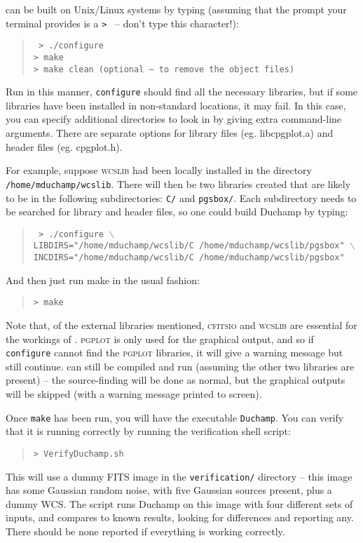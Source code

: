 \duchamp can be built on Unix/Linux systems by typing (assuming that
the prompt your terminal provides is a \texttt{> } -- don't type this
character!):
\begin{quote}
{\footnotesize
\texttt{%
> ./configure\\
> make\\
> make clean (optional -- to remove the object files)}
}
\end{quote}

Run in this manner, \texttt{configure} should find all the necessary
libraries, but if some libraries have been installed in non-standard
locations, it may fail. In this case, you can specify additional
directories to look in by giving extra command-line arguments. There
are separate options for library files (eg. libcpgplot.a) and header
files (eg. cpgplot.h).

For example, suppose \textsc{wcslib} had been locally installed in the
directory \texttt{/home/mduchamp/wcslib}. There will then be two
libraries created that are likely to be in the following
subdirectories: \texttt{C/} and \texttt{pgsbox/}. Each subdirectory
needs to be searched for library and header files, so one could build
Duchamp by typing:
\begin{quote}
{\footnotesize
\texttt{%
>  ./configure $\backslash$ \\ 
LIBDIRS="/home/mduchamp/wcslib/C /home/mduchamp/wcslib/pgsbox" 
$\backslash$\\
INCDIRS="/home/mduchamp/wcslib/C /home/mduchamp/wcslib/pgsbox"}
}
\end{quote}
And then just run make in the usual fashion:
\begin{quote}
{\footnotesize
\texttt{> make}
}
\end{quote}

Note that, of the external libraries mentioned, \textsc{cfitsio} and
\textsc{wcslib} are essential for the workings of
\duchamp. \textsc{pgplot} is only used for the graphical output, and
so if \texttt{configure} cannot find the \textsc{pgplot} libraries, it
will give a warning message but still continue. \duchamp can still be
compiled and run (assuming the other two libraries are present) -- the
source-finding will be done as normal, but the graphical outputs will
be skipped (with a warning message printed to screen).

Once \texttt{make} has been run, you will have the executable
\texttt{Duchamp}. You can verify that it is running correctly by
running the verification shell script:
\begin{quote}
{\footnotesize
\texttt{> VerifyDuchamp.sh}
}
\end{quote}
This will use a dummy FITS image in the \texttt{verification/}
directory -- this image has some Gaussian random noise, with five
Gaussian sources present, plus a dummy WCS. The script runs
Duchamp on this image with four different sets of inputs, and
compares to known results, looking for differences and reporting
any. There should be none reported if everything is working correctly.

